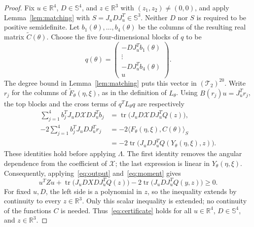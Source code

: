 \begin{proof}
Fix $u\in\mathbb R^4$, $D\in\mathbb S^4$, and
$z\in\mathbb R^3$ with $(z_1,z_2)\neq(0,0)$, and apply
Lemma~\ref{lem:matching} with
$S=J_uDJ_u^T\in\mathbb S^3$.  Neither $D$ nor $S$ is required to be
positive semidefinite.  Let $b_1(\theta),\ldots,b_4(\theta)$ be
the columns of the resulting real matrix $\widetilde C(\theta)$.
Choose the five four-dimensional blocks of $q$ to be
\[
  q(\theta)=
  \begin{pmatrix}
    -DJ_u^Tb_1(\theta)\\
    \vdots\\
    -DJ_u^Tb_4(\theta)\\
    u
  \end{pmatrix}.
\]
The degree bound in Lemma~\ref{lem:matching} puts this vector in
$(\mathcal T_2)^{20}$.  Write $r_j$ for the columns of
$\widetilde F_\theta(\eta,\xi)$, as in the definition of $L_\theta$.
Using $B(r_j)u=J_u^Tr_j$, the top blocks and the cross terms of
$q^TL_\theta q$ are respectively
\begin{align*}
  \sum_{j=1}^4 b_j^T J_uD\mathcal X DJ_u^Tb_j
    &=\operatorname{tr}\bigl(J_uD\mathcal X DJ_u^TQ(z)\bigr),\\
  -2\sum_{j=1}^4 b_j^TJ_uDJ_u^Tr_j
    &=-2\langle F_\theta(\eta,\xi),C(\theta)\rangle_S\\
    &=-2\operatorname{tr}\bigl(J_uDJ_u^T
        Q(Y_\theta(\eta,\xi),z)\bigr).
\end{align*}
These identities hold before applying $\Lambda$.  The first identity
removes the angular dependence from the coefficient of $\mathcal X$;
the last expression is linear in $Y_\theta(\eta,\xi)$.
Consequently, applying~\eqref{eq:output} and~\eqref{eq:moment} gives
\begin{equation}\label{eq:certificate}
  u^TZu+
  \operatorname{tr}\bigl(J_uDXDJ_u^TQ(z)\bigr)
  -2\operatorname{tr}\bigl(J_uDJ_u^TQ(y,z)\bigr)\geq0.
\end{equation}
For fixed $u,D$, the left side is a polynomial in $z$, so the inequality
extends by continuity to every $z\in\mathbb R^3$.  Only this scalar
inequality is extended; no continuity of the functions $C$ is needed.
Thus~\eqref{eq:certificate} holds for all $u\in\mathbb R^4$,
$D\in\mathbb S^4$, and $z\in\mathbb R^3$.


\end{proof}
